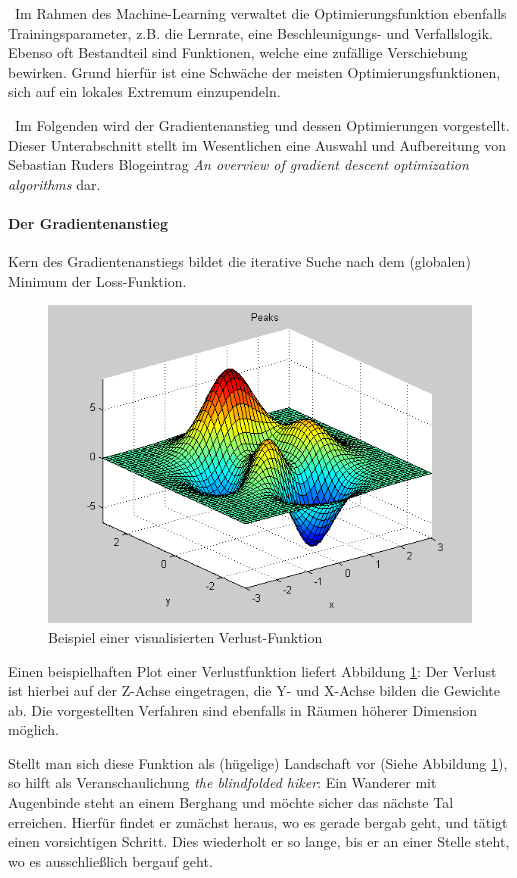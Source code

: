 ~\newline Im Rahmen des Machine-Learning verwaltet die Optimierungsfunktion ebenfalls Trainingsparameter, z.B. die Lernrate, eine Beschleunigungs- und Verfallslogik. Ebenso oft Bestandteil sind Funktionen, welche eine zufällige Verschiebung bewirken. Grund hierfür ist eine Schwäche der meisten Optimierungsfunktionen, sich auf ein lokales Extremum einzupendeln.

~\newline Im Folgenden wird der Gradientenanstieg und dessen Optimierungen vorgestellt. Dieser Unterabschnitt stellt im Wesentlichen eine Auswahl und Aufbereitung von Sebastian Ruders Blogeintrag \textit{An overview of gradient descent optimization algorithms} \cite{OptimizationFunction} dar.
\paragraph{Der Gradientenanstieg} Kern des Gradientenanstiegs bildet die iterative Suche nach dem (globalen) Minimum der Loss-Funktion. 
\begin{figure}[h]
	\begin{center}
		\includegraphics[width=0.6\linewidth]{Bilder/optimization}
		\caption[Loss-Function: \url{
			http://www.ahozer.com/research.html}]{Beispiel einer visualisierten Verlust-Funktion}
		\label{fig:Loss}
	\end{center}
\end{figure}
Einen beispielhaften Plot einer Verlustfunktion liefert Abbildung \ref{fig:Loss}: Der Verlust ist hierbei auf der Z-Achse eingetragen, die Y- und X-Achse bilden die Gewichte ab. Die vorgestellten Verfahren sind ebenfalls in Räumen höherer Dimension möglich.

Stellt man sich diese Funktion als (hügelige) Landschaft vor (Siehe Abbildung \ref{fig:Loss}), so hilft als Veranschaulichung \textit{the blindfolded hiker}: Ein Wanderer mit Augenbinde steht an einem Berghang und möchte sicher das nächste Tal erreichen. Hierfür findet er zunächst heraus, wo es gerade bergab geht, und tätigt einen vorsichtigen Schritt. Dies wiederholt er so lange, bis er an einer Stelle steht, wo es ausschließlich bergauf geht.

